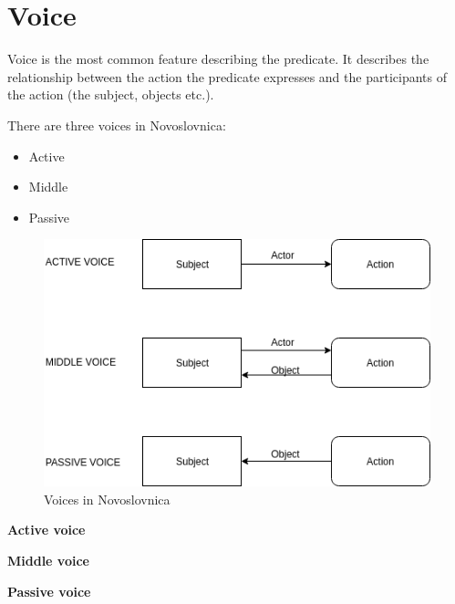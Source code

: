 \section{Voice}

Voice is the most common feature describing the predicate. It describes the relationship between the action the predicate expresses and the participants of the action (the subject, objects etc.).

There are three voices in Novoslovnica:

\begin{itemize}
	\item Active
	\item Middle
	\item Passive
\end{itemize}

\begin{figure}
	\includegraphics[width=\linewidth]{./sources/voices.png}
	\caption{Voices in Novoslovnica}
	\label{fig:voices}
\end{figure}

\textbf{Active voice}


\textbf{Middle voice}

\textbf{Passive voice}
